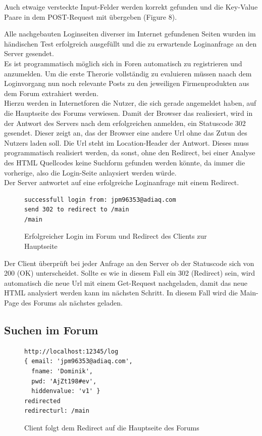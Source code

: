 Auch etwaige versteckte Input-Felder werden korrekt gefunden und die Key-Value Paare in dem POST-Request mit übergeben (Figure 8).
\newpage

Alle nachgebauten Loginseiten diverser im Internet gefundenen Seiten wurden im händischen Test erfolgreich ausgefüllt und die zu erwartende Loginanfrage an den Server gesendet.\\
Es ist programmatisch möglich sich in Foren automatisch zu registrieren und anzumelden. Um die erste Therorie vollständig zu evaluieren müssen naach dem Loginvorgang nun noch relevante Posts zu den jeweiligen Firmenprodukten aus dem Forum extrahiert werden.\\
Hierzu werden in Internetforen die Nutzer, die sich gerade angemeldet haben, auf die Hauptseite des Forums verwiesen. Damit der Browser das realiesiert, wird in der Antwort des Servers nach dem erfolgreichen anmelden, ein Statuscode 302 gesendet. Dieser zeigt an, das der Browser eine andere Url ohne das Zutun des Nutzers laden soll. Die Url steht im Location-Header der Antwort. Dieses muss programmatisch realisiert werden, da sonst, ohne den Redirect, bei einer Analyse des HTML Quellcodes keine Suchform gefunden werden könnte, da immer die vorherige, also die Login-Seite anlaysiert werden würde.\\
Der Server antwortet auf eine erfolgreiche Loginanfrage mit einem Redirect.

\begin{figure}[ht]
\begin{lstlisting}[language=HTML5]
successfull login from: jpm96353@adiaq.com
send 302 to redirect to /main
/main
\end{lstlisting}
\caption{Erfolgreicher Login im Forum und Redirect des Clients zur Hauptseite}
\end{figure}

Der Client überprüft  bei jeder Anfrage an den Server ob der Statuscode sich von 200 (OK) unterscheidet. Sollte es wie in diesem Fall ein 302 (Redirect) sein, wird automatisch die neue Url mit einem Get-Request nachgeladen, damit das neue HTML analysiert werden kann im nächsten Schritt. In diesem Fall wird die Main- Page des Forums als nächstes geladen.

\newpage

\subsection{Suchen im Forum}
\begin{figure}[ht]
\begin{lstlisting}[language=HTML5]
http://localhost:12345/log
{ email: 'jpm96353@adiaq.com',
  fname: 'Dominik',
  pwd: 'AjZt198#ev',
  hiddenvalue: 'v1' }
redirected
redirecturl: /main
\end{lstlisting}
\caption{Client folgt dem Redirect auf die Hauptseite des Forums}
\end{figure}

